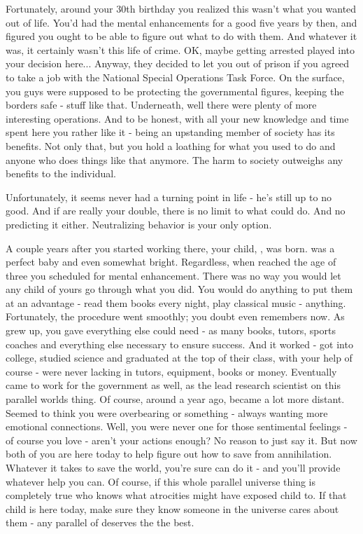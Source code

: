 \documentclass[char]{guildcamp3}
\begin{document}
Fortunately, around your 30th birthday you realized this wasn't what you wanted out of life. You'd had the mental enhancements for a good five years by then, and figured you ought to be able to figure out what to do with them. And whatever it was, it certainly wasn't this life of crime. OK, maybe getting arrested played into your decision here... Anyway, they decided to let you out of prison if you agreed to take a job with the National Special Operations Task Force. On the surface, you guys were supposed to be protecting the governmental figures, keeping the borders safe - stuff like that. Underneath, well there were plenty of more interesting operations. And to be honest, with all your new knowledge and time spent here you rather like it - being an upstanding member of society has its benefits. Not only that, but you hold a loathing for what you used to do and anyone who does things like that anymore. The harm to society outweighs any benefits to the individual. 


Unfortunately, it seems \cRogueTwo{\formal} never had a turning point in \cRogueTwo{\their} life - he's still up to no good. And if \cRogueTwo{\they} are really your double, there is no limit to what \cRogueTwo{\they} could do. And no predicting it either. Neutralizing \cRogueTwo{\their} behavior is your only option. 

A couple years after you started working there, your child, \cSciOne{\intro}, was born. \cSciOne{\they} was a perfect baby and even somewhat bright. Regardless, when \cSciOne{\they} reached the age of three you scheduled \cSciOne{\them} for mental enhancement. There was no way you would let any child of yours go through what you did. You would do anything to put them at an advantage - read them books every night, play classical music - anything. Fortunately, the procedure went smoothly; you doubt \cSciOne{\they} even remembers now. As \cSciOne{\informal} grew up, you gave \cSciOne{\them} everything else \cSciOne{\they} could need - as many books, tutors, sports coaches and everything else necessary to ensure success. And it worked - \cSciOne{\informal} got into college, studied science and graduated at the top of their class, with your help of course - \cSciOne{\they} were never lacking in tutors, equipment, books or money. Eventually \cSciOne{} came to work for the government as well, as the lead research scientist on this parallel worlds thing. Of course, around a year ago, \cSciOne{\they} became a lot more distant. Seemed to think you were overbearing or something - always wanting more emotional connections. Well, you were never one for those sentimental feelings - of course you love \cSciOne{\them} - aren't your actions enough? No reason to just say it. But now both of you are here today to help figure out how to save \bTechWorld{} from annihilation. Whatever it takes to save the world, you're sure \cSciOne{\informal} can do it - and you'll provide whatever help you can. Of course, if this whole parallel universe thing is completely true who knows what atrocities \cRogueTwo{} might have exposed  child to. If that child is here today, make sure they know someone in the universe cares about them - any parallel of \cSciOne{\informal} deserves the the best. 
\end{document}
